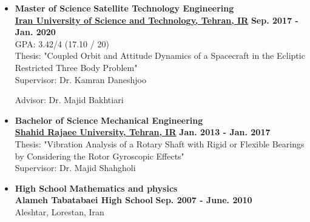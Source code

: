 \documentclass[10pt,a4paper,sans]{moderncv} %
\begin{document}
\begin{itemize}
	\item \textbf{Master of Science} \hfill \textbf{Satellite Technology Engineering} \\
	\href{http://www.iust.ac.ir/en}{\textbf{Iran University of Science and Technology, Tehran, IR}} \hfill \textbf{Sep. 2017 - Jan. 2020}\\ GPA: 3.42/4 (17.10 / 20) \\ Thesis: "Coupled Orbit and Attitude Dynamics of a Spacecraft in the Ecliptic Restricted Three Body Problem" \\ Supervisor: Dr. Kamran Daneshjoo
	\par 
	Advisor: Dr. Majid Bakhtiari
	
	
	\item \textbf{Bachelor of Science} \hfill \textbf{Mechanical Engineering} \\
	\href{https://sru.ac.ir/en}{\textbf{Shahid Rajaee University, Tehran, IR}} \hfill \textbf{Jan. 2013 - Jan. 2017} \\  Thesis: "Vibration Analysis of a Rotary Shaft with Rigid or Flexible Bearings by Considering the Rotor Gyroscopic Effects" \\ Supervisor: Dr. Majid Shahgholi
	
	
	\item \textbf{High School} \hfill \textbf{Mathematics and physics } \\
	{\textbf{Alameh Tabatabaei High School}} \hfill \textbf{Sep. 2007 - June. 2010} \\ Aleshtar, Lorestan, Iran   %

	

\end{itemize}
\end{document}
